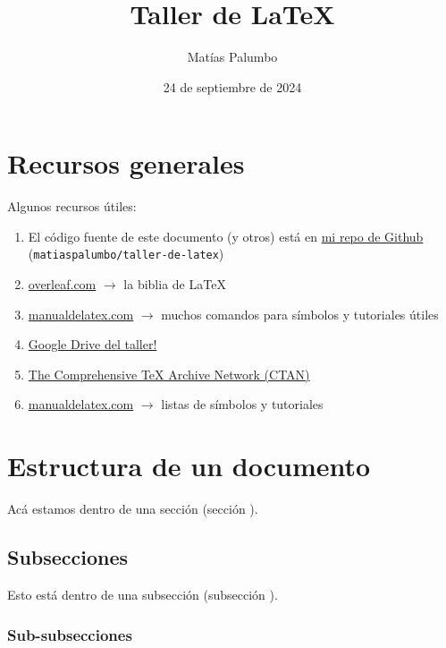 \documentclass[12pt, spanish]{article}
\title{Taller de \LaTeX}
\author{Matías Palumbo}
\date{24 de septiembre de 2024}
\theoremstyle{definition} %
\theoremstyle{remark} %
\theoremstyle{plain} %
\theoremstyle{plain} %
\theoremstyle{plain} %
\theoremstyle{plain} %
\theoremstyle{plain} %
\theoremstyle{remark} %
\begin{document}
\maketitle

\tableofcontents

\pagebreak

\section{Recursos generales}
\noindent Algunos recursos útiles:
\begin{enumerate}
    \item El código fuente de este documento (y otros) está en \href{https://github.com/matiaspalumbo/taller-de-latex}{mi repo de Github} (\verb|matiaspalumbo/taller-de-latex|)
    \item \href{www.overleaf.com}{overleaf.com} $\to$ la biblia de \LaTeX
    \item \href{www.manualdelatex.com}{manualdelatex.com} $\to$ muchos comandos para símbolos y tutoriales útiles
    \item \href{www.drive.google.com/drive/folders/1OXJNANEtlrzC934mgEcmJNUbtBfR32l9?usp=drive_link}{Google Drive del taller!}
    \item \href{https://ctan.org/?lang=en}{The Comprehensive TeX Archive Network (CTAN)}
    \item \href{https://manualdelatex.com/}{manualdelatex.com} $\to$ listas de símbolos y tutoriales
\end{enumerate}



\section{Estructura de un documento}

Acá estamos dentro de una sección (sección \thesection).

\subsection{Subsecciones}

Esto está dentro de una subsección (subsección \thesubsection).

\subsubsection{Sub-subsecciones}
\end{document}
